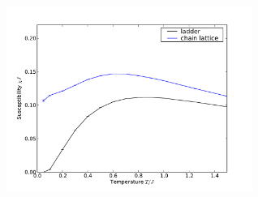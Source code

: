 \href{http://alps.comp-phys.org/vistrails/download.php?getvt=10&db=vistrails&host=alps.ethz.ch&port=3306&tag=&execute=True&showspreadsheetonly=True&embedWorkflow=True&includeFullTree=False&version=169}{\includegraphics[width=8cm]{vistrails_images/alps.ethz.ch_vistrails_3306_10_169_pdf/susceptibilities_None.pdf}
}